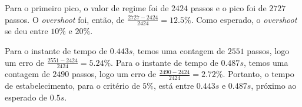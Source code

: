 \documentclass[a4paper,11pt]{article}
\begin{document}
Para o primeiro pico, o valor de regime foi de $2424$ passos e o pico foi de
$2727$ passos. O \textit{overshoot} foi, então, de
$\frac{2727 - 2424}{2424} = 12.5\%$. Como esperado, o \textit{overshoot} se deu
entre $10\%$ e $20\%$.

Para o instante de tempo de $0.443 s$, temos uma contagem de $2551$ passos, logo
um erro de $\frac{2551 - 2424}{2424} = 5.24\%$.
Para o instante de tempo de $0.487 s$, temos uma contagem de $2490$ passos,
logo um erro de $\frac{2490 - 2424}{2424} = 2.72\%$.
Portanto, o tempo de estabelecimento, para o critério de $5\%$, está entre
$0.443 s$ e $0.487 s$, próximo ao esperado de $0.5 s$.
\end{document}
